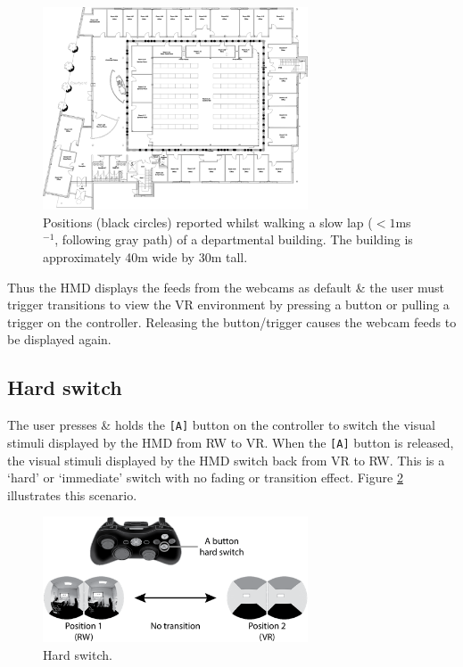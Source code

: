 \documentclass[oneside]{book}
\begin{document}
\begin{figure}[h]
	\begin{center}
		\includegraphics[width=0.7\textwidth]{images/jack-cole-splodges-black.png}
		\caption{Positions (black circles) reported whilst walking a slow lap ($<1$ms$^{-1}$, following gray path) of a departmental building. The building is approximately 40m wide by 30m tall.}
		\label{jack-cole-splodges}
	\end{center}
\end{figure}

Thus the HMD displays the feeds from the webcams as default \& the user must trigger transitions to view the VR environment by pressing a button or pulling a trigger on the controller. Releasing the button/trigger causes the webcam feeds to be displayed again.

\clearpage

\subsection{Hard switch}
\label{sub-hardswitch}
The user presses \& holds the \texttt{[A]} button on the controller to switch the visual stimuli displayed by the HMD from RW to VR. When the \texttt{[A]} button is released, the visual stimuli displayed by the HMD switch back from VR to RW. This is a `hard' or `immediate' switch with no fading or transition effect. Figure \ref{scenario1} illustrates this scenario.

\begin{figure}[h]
	\begin{center}
		\includegraphics[width=0.7\textwidth]{images/switching-hard-with-controller.png}
		\caption{Hard switch.}
		\label{scenario1}
	\end{center}
\end{figure}
\end{document}
